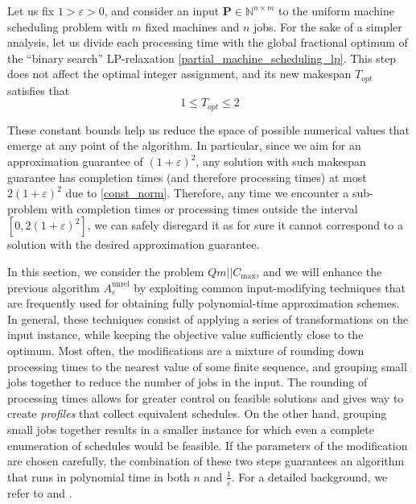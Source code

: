 \documentclass[moor,sglanonrev]{informs4}
\theoremstyle{plain}
\begin{document}
Let us fix $1>\varepsilon > 0$, and consider an input $\bm{P} \in \mathbb{N}^{n \times m}$ to the uniform machine scheduling problem with $m$ fixed machines and $n$ jobs. For the sake of a simpler analysis, let us divide each processing time with the global fractional optimum of the ``binary search'' LP-relaxation \eqref{partial_machine_scheduling_lp}. This step does not affect the optimal integer assignment, and its new makespan $T_{opt}$ satisfies that 
\begin{equation}\label{const_norm}
    1 \le T_{opt} \le 2
\end{equation}

These constant bounds help us reduce the space of possible numerical values that emerge at any point of the algorithm. In particular, since we aim for an approximation guarantee of $(1+\varepsilon)^2$, any solution with such makespan guarantee has completion times (and therefore processing times) at most $2(1+\varepsilon)^2$ due to \eqref{const_norm}. Therefore, any time we encounter a sub-problem with completion times or processing times outside the interval $[0,2(1+\varepsilon)^2]$, we can safely disregard it as for sure it cannot correspond to a solution with the desired approximation guarantee.

In this section, we consider the problem $Qm||C_{\text{max}}$, and we will enhance the previous algorithm $A^{\text{unrel}}_{\varepsilon}$ by exploiting common input-modifying techniques that are frequently used for obtaining fully polynomial-time approximation schemes. In general, these techniques consist of applying a series of transformations on the input instance, while keeping the objective value sufficiently close to the optimum. Most often, the modifications are a mixture of rounding down processing times to the nearest value of some finite sequence, and grouping small jobs together to reduce the number of jobs in the input. The rounding of processing times allows for greater control on feasible solutions and gives way to create \emph{profiles} that collect equivalent schedules. On the other hand, grouping small jobs together results in a smaller instance for which even a complete enumeration of schedules would be feasible. If the parameters of the modification are chosen carefully, the combination of these two steps guarantees an algorithm that runs in polynomial time in both $n$ and $\frac{1}{\varepsilon}$. For a detailed background, we refer to \cite{grouping_1} and \cite{grouping_2}.
\end{document}
